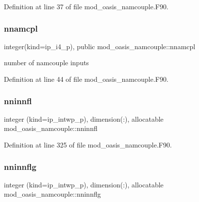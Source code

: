 Definition at line 37 of file mod\+\_\+oasis\+\_\+namcouple.\+F90.

\mbox{\label{namespacemod__oasis__namcouple_a5ca7cd6a5b9f939b68492200aa92bab4}} 
\subsubsection{\texorpdfstring{nnamcpl}{nnamcpl}}
{\footnotesize\ttfamily integer(kind=ip\+\_\+i4\+\_\+p), public mod\+\_\+oasis\+\_\+namcouple\+::nnamcpl}



number of namcouple inputs 



Definition at line 44 of file mod\+\_\+oasis\+\_\+namcouple.\+F90.

\mbox{\label{namespacemod__oasis__namcouple_a579387e570e26f2d6c6c2159824cf8a3}} 
\subsubsection{\texorpdfstring{nninnfl}{nninnfl}}
{\footnotesize\ttfamily integer (kind=ip\+\_\+intwp\+\_\+p), dimension(\+:), allocatable mod\+\_\+oasis\+\_\+namcouple\+::nninnfl\hspace{0.3cm}{\ttfamily [private]}}



Definition at line 325 of file mod\+\_\+oasis\+\_\+namcouple.\+F90.

\mbox{\label{namespacemod__oasis__namcouple_a6526a92cd5fa662f9da229806d062dc2}} 
\subsubsection{\texorpdfstring{nninnflg}{nninnflg}}
{\footnotesize\ttfamily integer (kind=ip\+\_\+intwp\+\_\+p), dimension(\+:), allocatable mod\+\_\+oasis\+\_\+namcouple\+::nninnflg\hspace{0.3cm}{\ttfamily [private]}}



